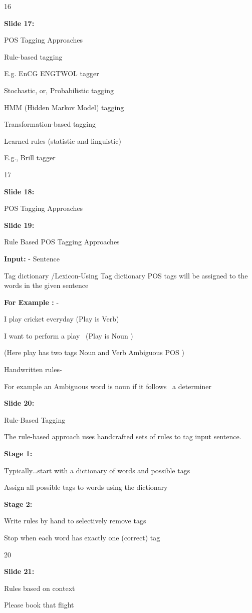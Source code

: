 \documentclass[11pt,a4paper]{article}
\begin{document}
16

\textbf{Slide 17:}

POS Tagging Approaches

Rule-based tagging

E.g. EnCG ENGTWOL tagger

Stochastic, or, Probabilistic tagging

HMM (Hidden Markov Model) tagging

Transformation-based tagging

Learned rules (statistic and linguistic)

E.g., Brill tagger

17

\textbf{Slide 18:}

POS Tagging Approaches

\textbf{Slide 19:}

Rule Based POS Tagging Approaches

\textbf{Input:} - Sentence

Tag dictionary /Lexicon-Using Tag dictionary POS tags will be assigned to the words in the given sentence

\textbf{For Example :} -

I play cricket everyday (Play is Verb)

I want to perform a play  (Play is Noun )

(Here play has two tags Noun and Verb Ambiguous POS )

Handwritten rules-

For example an Ambiguous word is noun if it follows  a determiner

\textbf{Slide 20:}

Rule-Based Tagging

The rule-based approach uses handcrafted sets of rules to tag input sentence.

\textbf{Stage 1:} 

Typically…start with a dictionary of words and possible tags

Assign all possible tags to words using the dictionary

\textbf{Stage 2:} 

Write rules by hand to selectively remove tags

Stop when each word has exactly one (correct) tag

20

\textbf{Slide 21:}

Rules based on context

Please book that flight
\end{document}
